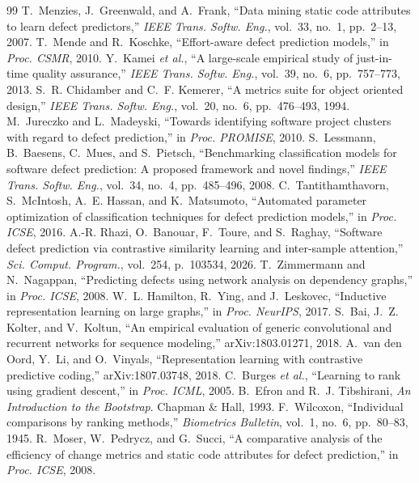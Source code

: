 \documentclass[conference,a4paper]{IEEEtran}
\begin{document}
\begin{thebibliography}{99}
 T.~Menzies, J.~Greenwald, and A.~Frank, ``Data mining static code attributes to learn defect
  predictors,'' \emph{IEEE Trans. Softw. Eng.}, vol.~33, no.~1, pp.~2--13, 2007.
 T.~Mende and R.~Koschke, ``Effort-aware defect prediction models,'' in \emph{Proc. CSMR}, 2010.
 Y.~Kamei \emph{et al.}, ``A large-scale empirical study of just-in-time quality assurance,''
  \emph{IEEE Trans. Softw. Eng.}, vol.~39, no.~6, pp.~757--773, 2013.
 S.~R. Chidamber and C.~F. Kemerer, ``A metrics suite for object oriented design,''
  \emph{IEEE Trans. Softw. Eng.}, vol.~20, no.~6, pp.~476--493, 1994.
 M.~Jureczko and L.~Madeyski, ``Towards identifying software project clusters with regard to
  defect prediction,'' in \emph{Proc. PROMISE}, 2010.
 S.~Lessmann, B.~Baesens, C.~Mues, and S.~Pietsch, ``Benchmarking classification models for
  software defect prediction: A proposed framework and novel findings,'' \emph{IEEE Trans. Softw. Eng.}, vol.~34,
  no.~4, pp.~485--496, 2008.
 C.~Tantithamthavorn, S.~McIntosh, A.~E. Hassan, and K.~Matsumoto, ``Automated parameter
  optimization of classification techniques for defect prediction models,'' in \emph{Proc. ICSE}, 2016.
 A.-R. Rhazi, O.~Banouar, F.~Toure, and S.~Raghay, ``Software defect prediction via contrastive
  similarity learning and inter-sample attention,'' \emph{Sci. Comput. Program.}, vol.~254, p.~103534, 2026.
 T.~Zimmermann and N.~Nagappan, ``Predicting defects using network analysis on dependency
  graphs,'' in \emph{Proc. ICSE}, 2008.
 W.~L. Hamilton, R.~Ying, and J.~Leskovec, ``Inductive representation learning on large
  graphs,'' in \emph{Proc. NeurIPS}, 2017.
 S.~Bai, J.~Z. Kolter, and V.~Koltun, ``An empirical evaluation of generic convolutional and
  recurrent networks for sequence modeling,'' arXiv:1803.01271, 2018.
 A.~van den Oord, Y.~Li, and O.~Vinyals, ``Representation learning with contrastive predictive
  coding,'' arXiv:1807.03748, 2018.
 C.~Burges \emph{et al.}, ``Learning to rank using gradient descent,'' in \emph{Proc. ICML}, 2005.
 B.~Efron and R.~J. Tibshirani, \emph{An Introduction to the Bootstrap}. Chapman \& Hall, 1993.
 F.~Wilcoxon, ``Individual comparisons by ranking methods,'' \emph{Biometrics Bulletin},
  vol.~1, no.~6, pp.~80--83, 1945.
 R.~Moser, W.~Pedrycz, and G.~Succi, ``A comparative analysis of the efficiency of change metrics
  and static code attributes for defect prediction,'' in \emph{Proc. ICSE}, 2008.
\end{thebibliography}
\end{document}
